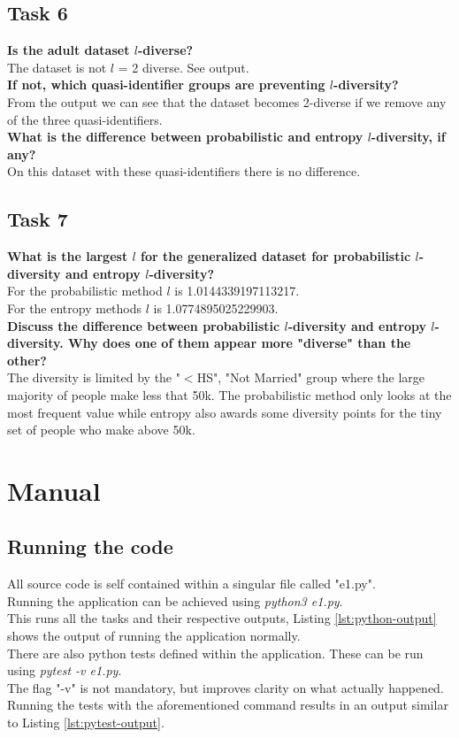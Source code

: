 \documentclass{article}
\begin{document}
		\subsection{Task 6}
			\textbf{Is the adult dataset $l$-diverse?}\\
			The dataset is not $l$ = 2 diverse. See output.\\
			\textbf{If not, which quasi-identifier groups are preventing $l$-diversity?}\\
			From the output we can see that the dataset becomes 2-diverse if we remove any of the three quasi-identifiers.\\
			\textbf{What is the difference between probabilistic and entropy $l$-diversity, if any?}\\
			On this dataset with these quasi-identifiers there is no difference.
		\subsection{Task 7}
			\textbf{What is the largest $l$ for the generalized dataset for probabilistic $l$-diversity and entropy
				$l$-diversity?}\\
				For the probabilistic method $l$ is 1.0144339197113217.\\
				For the entropy methods $l$ is 1.0774895025229903.\\
			\textbf{Discuss the difference between probabilistic $l$-diversity and entropy $l$-diversity. Why does one of them appear more "diverse" than the other?}\\
				The diversity is limited by the "$<$HS", "Not Married" group where the large majority of people make less that 50k.
				The probabilistic method only looks at the most frequent value while entropy also awards some diversity points for the tiny set of people who make above 50k.
				
	
	\section{Manual}
		\subsection{Running the code}
		All source code is self contained within a singular file called "e1.py".\\
		Running the application can be achieved using \textit{python3 e1.py}.\\
		This runs all the tasks and their respective outputs, Listing \ref{lst:python-output} shows the output of running the application normally.\\
		There are also python tests defined within the application. These can be run using \textit{pytest -v e1.py}.\\
		The flag "-v" is not mandatory, but improves clarity on what actually happened.\\
		Running the tests with the aforementioned command results in an output similar to Listing \ref{lst:pytest-output}.
		
\end{document}

